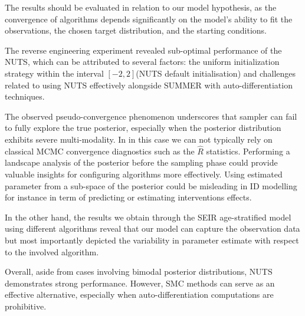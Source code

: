 \documentclass[nonatbib,preprint,12pt,authoryear]{elsarticle}
\begin{document}
The results should be evaluated in relation to our model hypothesis, as the convergence of algorithms depends significantly on the model’s ability to fit the observations, the chosen target distribution, and the starting conditions.

The reverse engineering experiment revealed sub-optimal performance of the NUTS, which can be attributed to several factors: the uniform initialization strategy within the interval 
$[-2,2]$(NUTS default initialisation) and challenges related to using NUTS effectively alongside SUMMER with auto-differentiation techniques. 

The observed pseudo-convergence phenomenon underscores that sampler can fail to fully explore the true posterior, especially when the posterior distribution exhibits severe multi-modality. In in this case we can not typically rely on classical MCMC convergence diagnostics such as the $\hat{R}$ statistics. Performing a landscape analysis of the posterior before the sampling phase could provide valuable insights for configuring algorithms more effectively. Using estimated parameter from a sub-space of the posterior could be misleading in ID modelling for instance in term of predicting or estimating interventions effects. 

In the other hand, the results we obtain through the SEIR age-stratified model using different algorithms reveal that our model can capture the observation data but most importantly depicted the variability in parameter estimate with respect to the involved algorithm.

Overall, aside from cases involving bimodal posterior distributions, NUTS demonstrates strong performance. However, SMC methods can serve as an effective alternative, especially when auto-differentiation computations are prohibitive.

\newpage




\end{document}
